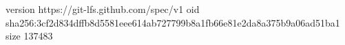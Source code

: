version https://git-lfs.github.com/spec/v1
oid sha256:3cf2d834dffb8d5581eee614ab727799b8a1fb66e81e2da8a375b9a06ad51ba1
size 137483
